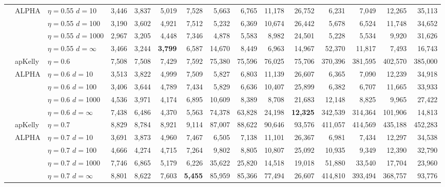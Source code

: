 \documentclass[12pt,runningheads]{llncs}
\begin{document}
{\begin{table}
\begin{tabular}{lll|rrrr|rrrr|rrrr}
\cline{2-15}
& ALPHA & $\eta=$0.55 $d=$10 & 3,446  & 3,837  & 5,019  & 7,528  & 5,663  & 6,765  & 11,178  & 26,752  & 6,231  & 7,049  & 12,265  & 35,113  \\
&  & $\eta=$0.55 $d=$100 & 3,190  & 3,602  & 4,921  & 7,512  & 5,232  & 6,369  & 10,674  & 26,442  & 5,678  & 6,524  & 11,748  & 34,652  \\
&  & $\eta=$0.55 $d=$1000 & 2,967  & 3,205  & 4,448  & 7,346  & 4,878  & 5,583  & 8,982  & 24,501  & 5,228  & 5,534  & 9,920  & 31,626  \\
 &  & $\eta=$0.55 $d=\infty$ & 3,466  & 3,244  & \bf{3,799}  & 6,587  & 14,670  & 8,449  & 6,963  & 14,967  & 52,370  & 11,817  & 7,493  & 16,743  \\
\cline{2-15} & apKelly & $\eta=$0.6 & 7,508  & 7,508  & 7,429  & 7,592  & 75,380  & 75,596  & 76,025  & 75,706  & 370,396  & 381,595  & 402,570  & 385,000  \\
\cline{2-15}
& ALPHA & $\eta=$0.6 $d=$10 & 3,513  & 3,822  & 4,999  & 7,509  & 5,827  & 6,803  & 11,139  & 26,607  & 6,365  & 7,090  & 12,239  & 34,918  \\
&  & $\eta=$0.6 $d=$100 & 3,406  & 3,644  & 4,789  & 7,434  & 5,829  & 6,636  & 10,407  & 25,899  & 6,382  & 6,707  & 11,665  & 33,933  \\
&  & $\eta=$0.6 $d=$1000 & 4,536  & 3,971  & 4,174  & 6,895  & 10,609  & 8,389  & 8,708  & 21,683  & 12,148  & 8,825  & 9,965  & 27,422  \\
 &  & $\eta=$0.6 $d=\infty$ & 7,438  & 6,486  & 4,370  & 5,563  & 74,378  & 63,828  & 24,198  & \bf{12,325}  & 342,539  & 314,364  & 101,906  & 14,813  \\
\cline{2-15} & apKelly & $\eta=$0.7 & 8,829  & 8,784  & 8,921  & 9,114  & 87,007  & 88,622  & 90,646  & 93,576  & 411,057  & 414,569  & 435,188  & 452,283  \\
\cline{2-15}
& ALPHA & $\eta=$0.7 $d=$10 & 3,691  & 3,873  & 4,960  & 7,467  & 6,505  & 7,138  & 11,101  & 26,367  & 6,981  & 7,434  & 12,297  & 34,538  \\
&  & $\eta=$0.7 $d=$100 & 4,666  & 4,274  & 4,715  & 7,264  & 9,802  & 8,805  & 10,807  & 25,092  & 10,935  & 9,349  & 12,390  & 32,790  \\
&  & $\eta=$0.7 $d=$1000 & 7,746  & 6,865  & 5,179  & 6,226  & 35,622  & 25,820  & 14,518  & 19,018  & 51,880  & 33,540  & 17,704  & 23,960  \\
 &  & $\eta=$0.7 $d=\infty$ & 8,801  & 8,622  & 7,603  & \bf{5,455}  & 85,959  & 85,366  & 77,494  & 26,607  & 414,810  & 393,494  & 368,757  & 93,776  \\

\end{tabular}
\end{table}}
\end{document}
